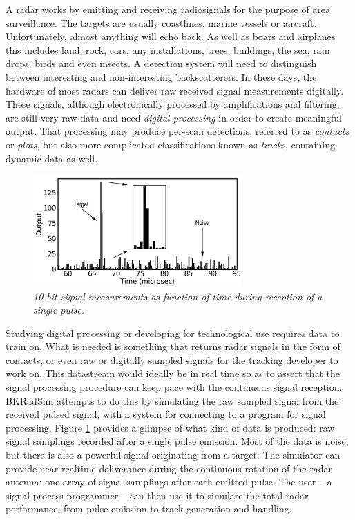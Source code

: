\documentclass[letterpaper]{book}
\begin{document}
A radar works by emitting and receiving radiosignals for the purpose of area surveillance. The targets are usually coastlines, marine vessels or aircraft. Unfortunately, almost anything will echo back. As well as boats and airplanes this includes land, rock, cars, any installations, trees, buildings, the sea, rain drops, birds and even insects. A detection system will need to distinguish between interesting and non-interesting backscatterers. In these days, the hardware of most radars can deliver raw received signal measurements digitally. These signals, although electronically processed by amplifications and filtering, are still very raw data and need \textit{digital processing} in order to create meaningful output. That processing may produce per-scan detections, referred to as \textit{contacts} or \textit{plots}, but also more complicated classifications known as \textit{tracks}, containing dynamic data as well.

\begin{figure}
  \includegraphics[width=8cm]{noise_target_3_c.png}
  \caption{\textit{10-bit signal measurements as function of time during reception of a single pulse.}}
  \label{fig:noise_target}
\end{figure}

Studying digital processing or developing for technological use requires data to train on. What is needed is something that returns radar signals in the form of contacts, or even raw or digitally sampled signals for the tracking developer to work on. This datastream would ideally be in real time so as to assert that the signal processing procedure can keep pace with the continuous signal reception. BKRadSim attempts to do this by simulating the raw sampled signal from the received pulsed signal, with a system for connecting to a program for signal processing. Figure \ref{fig:noise_target} provides a glimpse of what kind of data is produced: raw signal samplings recorded after a single pulse emission. Most of the data is noise, but there is also a powerful signal originating from a target. The simulator can provide near-realtime deliverance during the continuous rotation of the radar antenna: one array of signal samplings after each emitted pulse. The user -- a signal process programmer -- can then use it to simulate the total radar performance, from pulse emission to track generation and handling. 
\end{document}

